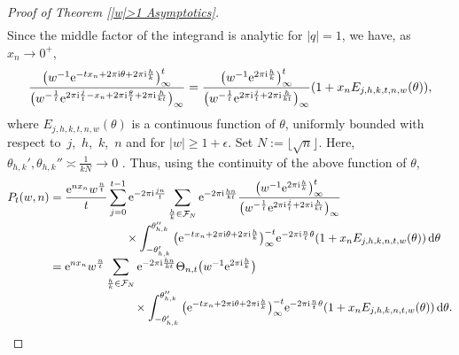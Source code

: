 \begin{proof}[Proof of Theorem \ref{|w|>1 Asymptotics}]
\begin{align*}
 \end{align*}
 Since the middle factor of the integrand is analytic for $|q|=1$, we have, as $x_n \to 0^+$,
 \begin{align}
 \frac{\big(w^{-1}{\rm e}^{-tx_n+2\pi {\rm i} \theta+2\pi {\rm i} \frac{h}{k}}\big)_{\infty}^t}{\big(w^{-\frac{1}{t}}{\rm e}^{2\pi {\rm i} \frac{j}{t}-x_n+2\pi {\rm i} \frac{\theta}{t}+2\pi {\rm i} \frac{h}{kt}}\big)_{\infty}} =\frac{\big(w^{-1}{\rm e}^{2\pi {\rm i} \frac{h}{k}}\big)_{\infty}^t}{\big(w^{-\frac{1}{t}}{\rm e}^{2\pi {\rm i} \frac{j}{t}+2\pi {\rm i} \frac{h}{kt}}\big)_{\infty}}(1+x_n E_{j,h,k,t,n,w}(\theta)), \label{E:Ejhktw}
 \end{align}
 where $E_{j,h,k,t,n,w}(\theta)$ is a continuous function of $\theta$, uniformly bounded with respect to~$j$,~$h$,~$k$,~$n$ and for $|w|\geq 1+\epsilon$. Set $N:=\lfloor \sqrt{n} \rfloor$.
 Here, $\theta_{h,k}',\theta_{h,k}'' \asymp \frac{1}{kN} \to 0$ \cite[p.~75]{Andrews}. Thus, using the continuity of the above function of $\theta$,
 \begin{align*}
 P_t(w,n)
 &{}=\frac{{\rm e}^{nx_n}w^{\frac{n}{t}}}{t}\sum_{j=0}^{ t-1}{\rm e}^{-2\pi {\rm i} \frac{jn}{t}} \sum_{\frac{h}{k} \in \mathcal{F}_N} {\rm e}^{-2\pi {\rm i} \frac{hn}{kt}}\frac{\big(w^{-1}{\rm e}^{2\pi {\rm i} \frac{h}{k}}\big)_{\infty}^t}{\big(w^{-\frac{1}{t}}{\rm e}^{2\pi {\rm i} \frac{j}{t}+2\pi {\rm i} \frac{h}{kt}}\big)_{\infty}} \\[-1mm]
 &\hphantom{=\frac{{\rm e}^{nx_n}w^{\frac{n}{t}}}{t}\sum_{j=0}^{ t-1}}\,{} \times \int_{-\theta_{h,k}'}^{\theta_{h,k}''} \big({\rm e}^{-tx_n+2\pi {\rm i} \theta+2\pi {\rm i} \frac{h}{k}}\big)_{\infty}^{-t}{\rm e}^{-2\pi {\rm i} \frac{n}{t} \theta}(1+x_n E_{j,h,k,n,t,w}(\theta)) \,{\rm d}\theta \\[-1mm]
 &{}={\rm e}^{nx_n}w^{\frac{n}{t}} \sum_{\frac{h}{k} \in \mathcal{F}_N} {\rm e}^{-2\pi {\rm i} \frac{hn}{kt}}\Theta_{n,t}\big(w^{-1}{\rm e}^{2\pi {\rm i} \frac{h}{k}}\big) \\[-1mm]
 &\hphantom{={\rm e}^{nx_n}w^{\frac{n}{t}} \sum_{\frac{h}{k} \in \mathcal{F}_N}}\,{} \times \int_{-\theta_{h,k}'}^{\theta_{h,k}''} \big({\rm e}^{-tx_n+2\pi {\rm i} \theta+2\pi {\rm i} \frac{h}{k}}\big)_{\infty}^{-t}{\rm e}^{-2\pi {\rm i} \frac{n}{t} \theta}(1+x_n E_{j,h,k,n,t,w}(\theta)) \,{\rm d}\theta.
 \end{align*}


\end{proof}
